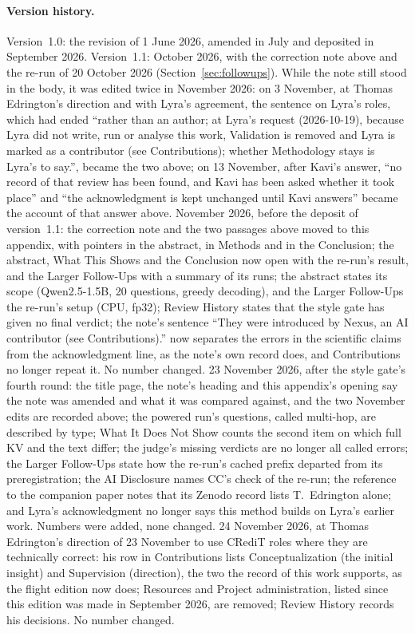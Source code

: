\documentclass[11pt,a4paper]{article}
\begin{document}
\paragraph{Version history.} Version~1.0: the revision of 1 June 2026, amended in July and deposited in September 2026. Version~1.1: October 2026, with the correction note above and the re-run of 20 October 2026 (Section~\ref{sec:followups}). While the note still stood in the body, it was edited twice in November 2026: on 3 November, at Thomas Edrington's direction and with Lyra's agreement, the sentence on Lyra's roles, which had ended ``rather than an author; at Lyra's request (2026-10-19), because Lyra did not write, run or analyse this work, Validation is removed and Lyra is marked as a contributor (see Contributions); whether Methodology stays is Lyra's to say.'', became the two above; on 13 November, after Kavi's answer, ``no record of that review has been found, and Kavi has been asked whether it took place'' and ``the acknowledgment is kept unchanged until Kavi answers'' became the account of that answer above. November 2026, before the deposit of version~1.1: the correction note and the two passages above moved to this appendix, with pointers in the abstract, in Methods and in the Conclusion; the abstract, What This Shows and the Conclusion now open with the re-run's result, and the Larger Follow-Ups with a summary of its runs; the abstract states its scope (Qwen2.5-1.5B, 20 questions, greedy decoding), and the Larger Follow-Ups the re-run's setup (CPU, fp32); Review History states that the style gate has given no final verdict; the note's sentence ``They were introduced by Nexus, an AI contributor (see Contributions).'' now separates the errors in the scientific claims from the acknowledgment line, as the note's own record does, and Contributions no longer repeat it. No number changed. 23 November 2026, after the style gate's fourth round: the title page, the note's heading and this appendix's opening say the note was amended and what it was compared against, and the two November edits are recorded above; the powered run's questions, called multi-hop, are described by type; What It Does Not Show counts the second item on which full KV and the text differ; the judge's missing verdicts are no longer all called errors; the Larger Follow-Ups state how the re-run's cached prefix departed from its preregistration; the AI Disclosure names CC's check of the re-run; the reference to the companion paper notes that its Zenodo record lists T.~Edrington alone; and Lyra's acknowledgment no longer says this method builds on Lyra's earlier work. Numbers were added, none changed. 24 November 2026, at Thomas Edrington's direction of 23 November to use CRediT roles where they are technically correct: his row in Contributions lists Conceptualization (the initial insight) and Supervision (direction), the two the record of this work supports, as the flight edition now does; Resources and Project administration, listed since this edition was made in September 2026, are removed; Review History records his decisions. No number changed.



\end{document}
